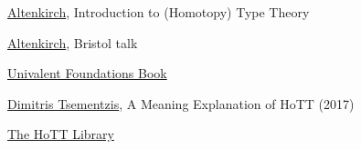 \href{http://www.cs.nott.ac.uk/~psztxa/talks/fmv18.pdf}{Altenkirch}, Introduction to (Homotopy) Type Theory

\href{http://www.cs.nott.ac.uk/~psztxa/talks/bristol-16.pdf}{Altenkirch}, Bristol talk

\href{https://www.heidelberg-laureate-forum.org/wp-content/uploads/2013/10/Homotopy-Type-Theory_Univalent-Foundations-of-Mathematics.pdf}{Univalent Foundations Book}

\href{http://philsci-archive.pitt.edu/12824/1/A.Meaning.Explanation.for.HoTT.pdf}{Dimitris Tsementzis}, A Meaning Explanation of HoTT (2017)

\href{https://www.researchgate.net/publication/312243911_The_HoTT_library_a_formalization_of_homotopy_type_theory_in_Coq}{The HoTT Library}
